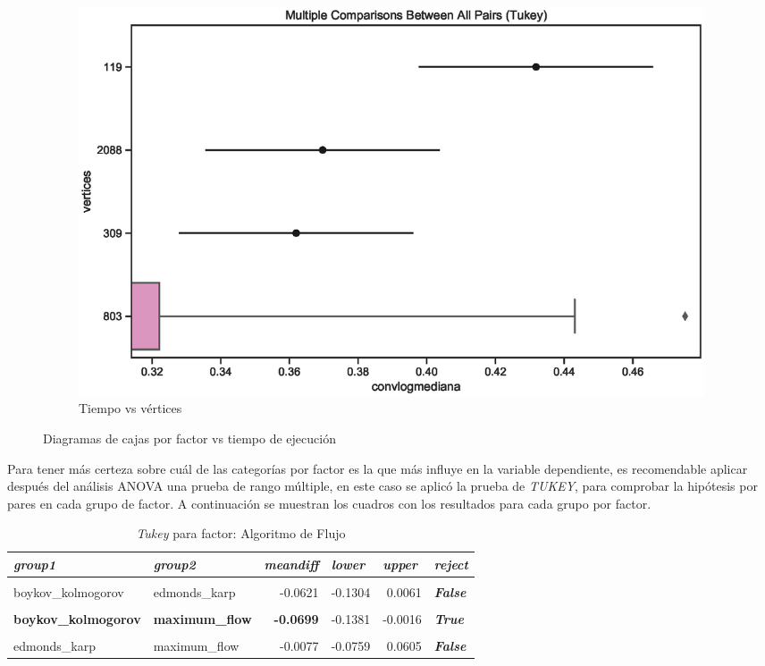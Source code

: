 \documentclass{article}
\begin{document}
\begin{figure}[h]
\begin{subfigure}{0.5\textwidth}
\includegraphics[width=0.9\linewidth]{Imagenes/aboxplotvertices.eps}
\caption{Tiempo vs vértices}
\end{subfigure}
 
\caption{Diagramas de cajas por factor vs tiempo de ejecución}
\label{fig:Fig2}
\end{figure}

Para tener más certeza sobre cuál de las categorías por factor es la que más influye en la variable dependiente, es recomendable aplicar después del análisis ANOVA una prueba de rango múltiple, en este caso se aplicó la prueba de \textit{TUKEY}, para comprobar la hipótesis por pares en cada grupo de factor. A continuación se muestran los cuadros con los resultados para cada grupo por factor.

\begin{table}[htbp]
  \centering
  \caption{\textit{Tukey} para factor: Algoritmo de Flujo}
    \begin{tabular}{llrrrl}
    \toprule
    \textit{\textbf{group1}} & \textit{\textbf{group2}} & \multicolumn{1}{l}{\textit{\textbf{meandiff}}} & \multicolumn{1}{l}{\textit{\textbf{lower}}} & \multicolumn{1}{l}{\textit{\textbf{upper}}} & \textit{\textbf{reject}} \\
    \midrule
          &       &       &       &       &  \\
    boykov\_kolmogorov & edmonds\_karp & -0.0621 & -0.1304 & 0.0061 & \textit{\textbf{False}} \\
          &       &       &       &       &  \\
    \textbf{boykov\_kolmogorov} & \textbf{maximum\_flow} & \textbf{-0.0699} & -0.1381 & -0.0016 & \textit{\textbf{True}} \\
          &       &       &       &       &  \\
    edmonds\_karp & maximum\_flow & -0.0077 & -0.0759 & 0.0605 & \textit{\textbf{False}} \\
    \bottomrule
    \end{tabular}%
  \label{tab:addlabel}%
\end{table}%
\end{document}
